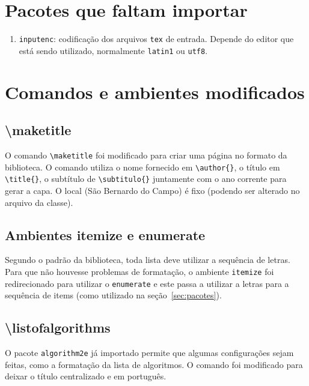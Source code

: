 \documentclass{fei}
\begin{document}
\section{Pacotes que faltam importar}

    \begin{enumerate}
        \item\texttt{inputenc}: codificação dos arquivos \texttt{tex} de entrada. Depende do editor que está sendo utilizado, normalmente \texttt{latin1} ou \texttt{utf8}.
    \end{enumerate}

\section{Comandos e ambientes modificados}
    
    \subsection{\textbackslash maketitle}
    
    O comando \verb+\maketitle+ foi modificado para criar uma página no formato da biblioteca. O comando utiliza o nome fornecido em \verb+\author{}+, o título em \verb+\title{}+, o subtítulo de \verb+\subtitulo{}+ juntamente com o ano corrente para gerar a capa. O local (São Bernardo do Campo) é fixo (podendo ser alterado no arquivo da classe).

    \subsection{Ambientes itemize e enumerate}
    
    Segundo o padrão da biblioteca, toda lista deve utilizar a sequência de letras. Para que não houvesse problemas de formatação, o ambiente \texttt{itemize} foi redirecionado para utilizar o \texttt{enumerate} e este passa a utilizar a letras para a sequência de items (como utilizado na seção~\ref{sec:pacotes}).
    
    \subsection{\textbackslash listofalgorithms}
    
    O pacote \texttt{algorithm2e} já importado permite que algumas configurações sejam feitas, como a formatação da lista de algoritmos. O comando foi modificado para deixar o título centralizado e em português.
    
\end{document}
